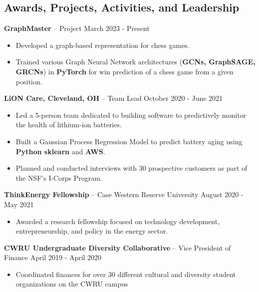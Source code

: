 \documentclass{res}
\begin{document}
\begin{resume}
\section{Awards, Projects, Activities, and Leadership} 
{\large{\bf GraphMaster} – Project \hfill March 2023 - Present}
\begin{itemize} \itemsep -2pt
	\item Developed a graph-based representation for chess games.
	\item Trained various Graph Neural Network architectures (\textbf{GCNs, GraphSAGE, GRCNs}) in \textbf{PyTorch} for win prediction of a chess game from a given position.
\end{itemize}
{\large{\bf LiON Care, Cleveland, OH} – Team Lead \hfill October 2020 - June 2021}
\begin{itemize} \itemsep -2pt
	\item Led a 5-person team dedicated to building software to predictively monitor the health of lithium-ion batteries.
	\item Built a Gaussian Process Regression Model to predict battery aging using \textbf{Python sklearn} and \textbf{AWS}.
	\item Planned and conducted interviews with 30 prospective customers as part of the NSF's I-Corps Program.
\end{itemize}
{\large{\bf  ThinkEnergy Fellowship } – Case Western Reserve University  \hfill    August 2020 - May 2021 }
\begin{itemize} \itemsep -2pt
	\item Awarded a research fellowship focused on technology development, entrepreneurship, and policy in the energy sector.
\end{itemize}
{\large{\bf  CWRU Undergraduate Diversity Collaborative} – Vice President of Finance     \hfill    April 2019 - April 2020 }
 \begin{itemize} \itemsep -2pt
 \item Coordinated finances for over 30 different cultural and diversity student organizations on the CWRU campus 
 \end{itemize}

		

\end{resume} 
\end{document}
